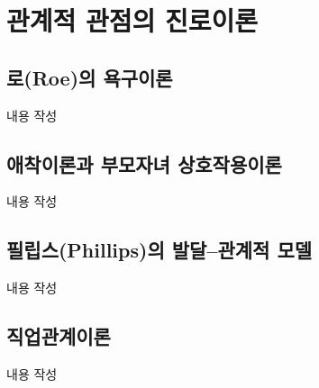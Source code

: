 \section{관계적 관점의 진로이론}

\subsection{로(Roe)의 욕구이론}
내용 작성

\subsection{애착이론과 부모자녀 상호작용이론}
내용 작성

\subsection{필립스(Phillips)의 발달–관계적 모델}
내용 작성

\subsection{직업관계이론}
내용 작성
